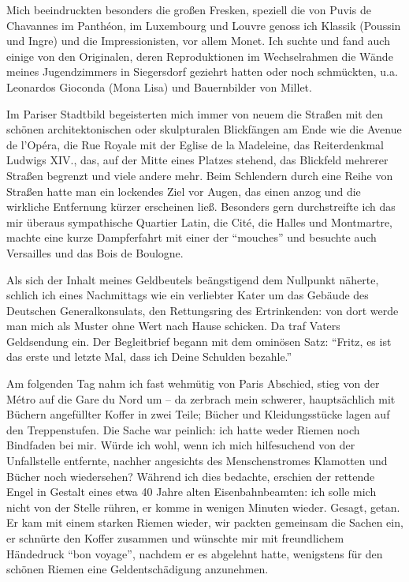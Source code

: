 \documentclass[a5paper,pagesize,10pt,twoside=true]{scrbook}
\begin{document}
Mich beeindruckten besonders die großen Fresken, speziell die von Puvis de Chavannes im Panthéon, im Luxembourg und Louvre genoss ich Klassik (Poussin und Ingre) und die Impressionisten, vor allem Monet. Ich suchte und fand auch einige von den Originalen, deren Reproduktionen im Wechselrahmen die Wände meines Jugendzimmers in Siegersdorf geziehrt hatten oder noch schmückten, u.a. Leonardos Gioconda (Mona Lisa) und Bauernbilder von Millet.

Im Pariser Stadtbild begeisterten mich immer von neuem die Straßen mit den schönen architektonischen oder skulpturalen Blickfängen am Ende wie die Avenue de l'Opéra, die Rue Royale mit der Eglise de la Madeleine, das Reiterdenkmal Ludwigs XIV., das, auf der Mitte eines Platzes stehend, das Blickfeld mehrerer Straßen begrenzt und viele andere mehr. Beim Schlendern durch eine Reihe von Straßen hatte man ein lockendes Ziel vor Augen, das einen anzog und die wirkliche Entfernung kürzer erscheinen ließ. Besonders gern durchstreifte ich das mir überaus sympathische Quartier Latin, die Cité, die Halles und Montmartre, machte eine kurze Dampferfahrt mit einer der \enquote{mouches} und besuchte auch Versailles und das Bois de Boulogne.

Als sich der Inhalt meines Geldbeutels beängstigend dem Nullpunkt näherte, schlich ich eines Nachmittags wie ein verliebter Kater um das Gebäude des Deutschen Generalkonsulats, den Rettungsring des Ertrinkenden: von dort werde man mich als Muster ohne Wert nach Hause schicken. Da traf Vaters Geldsendung ein. Der Begleitbrief begann mit dem ominösen Satz: \enquote{Fritz, es ist das erste und letzte Mal, dass ich Deine Schulden bezahle.}

Am folgenden Tag nahm ich fast wehmütig von Paris Abschied, stieg von der Métro auf die Gare du Nord um -- da zerbrach mein schwerer, hauptsächlich mit Büchern angefüllter Koffer in zwei Teile; Bücher und Kleidungsstücke lagen auf den Treppenstufen. Die Sache war peinlich: ich hatte weder Riemen noch Bindfaden bei mir. Würde ich wohl, wenn ich mich hilfesuchend von der Unfallstelle entfernte, nachher angesichts des Menschenstromes Klamotten und Bücher noch wiedersehen? Während ich dies bedachte, erschien der rettende Engel in Gestalt eines etwa 40 Jahre alten Eisenbahnbeamten: ich solle mich nicht von der Stelle rühren, er komme in wenigen Minuten wieder. Gesagt, getan. Er kam mit einem starken Riemen wieder, wir packten gemeinsam die Sachen ein, er schnürte den Koffer zusammen und wünschte mir mit freundlichem Händedruck \enquote{bon voyage}, nachdem er es abgelehnt hatte, wenigstens für den schönen Riemen eine Geldentschädigung anzunehmen.
\end{document}
